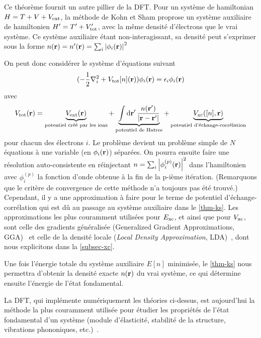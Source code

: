 Ce théorème fournit un autre pillier de la DFT\@.
Pour un système de hamiltonian $H = T + V + V_{\textnormal{ext}}$,
la méthode de Kohn et Sham proprose un système auxiliaire de hamiltonien $H' = T' + V'_{\textnormal{tot}}$,
avec la même densité d'électrons que le vrai système.
Ce système auxiliaire étant non-interagissant, sa densité peut s'exprimer sous la forme
$n(\vb{r}) = n'(\vb{r}) = \sum_i \abs{\phi_i(\vb{r})}^2$

On peut donc considérer le système d'équations suivant
\begin{equation}
  \label{eqn-kseqns}
  (-\frac{1}{2}\laplacian_i + V_{\V{tot}}[n](\vb{r}))\phi_i(\vb{r}) = \epsilon_i\phi_i(\vb{r})
\end{equation}
avec
\begin{equation}
  \label{eqn-Vtot}
  V_{\textnormal{tot}}(\vb{r}) = \underbrace{V_{\textnormal{ext}}(\vb{r})}_\text{potentiel créé par les ions}
  + \underbrace{\int \dd{\vb{r}'} \frac{n(\vb{r}')}{\abs{\vb{r} - \vb{r}'}}}_\text{potentiel de Hatree}
  + \underbrace{V_{\textnormal{xc}}([n], \vb{r})}_\text{potentiel d'échange-corrélation}
\end{equation}
pour chacun des électrons $i$.
Le problème devient un problème simple de $N$ équations à une variable (en $\phi_i(\vb{r})$) séparées.
On pourra ensuite faire une résolution auto-consistente en réinjectant
$n = \sum_i \abs{\phi_i^{(p)}(\vb{r})}^2 $ dans l'hamiltonien avec $\phi_i^{(p)}$
la fonction d'onde obtenue à la fin de la p-ième itération.
(Remarquons que le critère de convergence de cette méthode n'a toujours pas été trouvé.)
Cependant, il y a une approximation à faire pour le terme de potentiel d'échange-corrélation qui est dû au passage au système auxiliaire dans le \cref{thm-ks}.
Les approximations les plus couramment utilisées pour $E_{\textnormal{xc}}$, et ainsi que pour $V_{\textnormal{xc}}$,
sont celle des gradients généralisée (Generalized Gradient Approximations, GGA)~\cite{Langreth1980, Perdew1986, Perdew1992}
et celle de la densité locale (\textit{Local Density Approximation}, LDA)~\cite{Kohn1965},
dont nous explicitons dans la \cref{subsec-xc}.

Une fois l'énergie totale du système auxiliaire $E[n]$ minimisée,
le \cref{thm-ks} nous permettra d'obtenir la densité exacte $n(\vb{r})$ du vrai système,
ce qui détermine ensuite l'énergie de l'état fondamental.

La DFT, qui implémente numériquement les théories ci-dessus,
est aujourd'hui la méthode la plus couramment utilisée pour étudier
les propriétés de l'état fondamental d'un système
(module d'élasticité, stabilité de la structure, vibrations phononiques, etc.)~\cite{Martin2004}.

